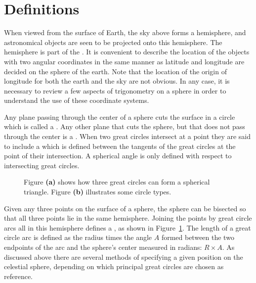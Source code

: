 \section{Definitions}
When viewed from the surface of Earth, the sky above forms a hemisphere, and 
astronomical objects are seen to be projected onto this hemisphere. The hemisphere is part
of the .
It is convenient to describe the location of the objects with two angular coordinates in the
same manner as latitude and longitude are decided on the sphere of the earth. 
Note that the location of the origin of longitude for both the earth and the 
sky are not obvious. In any case, it is necessary to review a few aspects of 
trigonometry on a sphere in order to understand the use of these coordinate 
systems.

Any plane passing through the center of a sphere cuts the surface in a
circle which is called a . Any other plane that cuts
the sphere, but that does not pass through the center is a {}. When two great circles intersect at a point they are said
to include a {} which is defined between the
tangents of the great circles at the point of their intersection. A
spherical angle is only defined with respect to intersecting great
circles.
%
\begin{figure}[htpb]
	\centering
	\begin{subfigure}[t]{0.50\linewidth}
	\centering
	
	\caption{}
	\label{fig:cel-sph-tri}
	\end{subfigure}%
	\begin{subfigure}[t]{0.50\linewidth}
	\centering
	
	\caption{}
	\label{fig:cel-sph-circ}
	\end{subfigure}
	\caption{Figure \textbf{(a)} shows how three great circles can form a spherical triangle.
	Figure \textbf{(b)} illustrates some circle types.}
\end{figure}
%
Given any three points on the surface of a sphere, the sphere can be
bisected so that all three points lie in the same hemisphere. Joining
the points by great circle arcs all in this hemisphere defines a
{}, as shown in Figure~\ref{fig:cel-sph-tri}.
The length of a great circle arc is defined as
the radius times the angle $A$ formed between the two endpoints of the
arc and the sphere's center measured in radians: $R\times A$.
As discussed above there are several methods of specifying a given position on the
celestial sphere, depending on which principal great circles are
chosen as reference.

